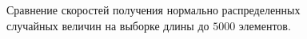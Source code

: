\documentclass[12pt, a4paper]{article}
\begin{document}
\begin{figure}[H]
\caption{Сравнение скоростей получения нормально распределенных случайных величин на выборке длины до $5000$ элементов.}
\end{figure}
\end{document}
